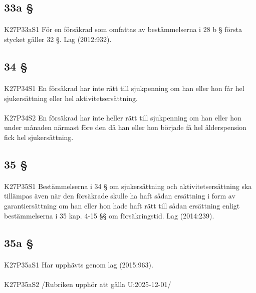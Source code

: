 \documentclass[a4paper,notitlepage,openany,10pt]{book}
\begin{document}
\subsection*{33a §}
\paragraph*{}
{\tiny K27P33aS1}
För en försäkrad som omfattas av bestämmelserna i 28 b § första stycket gäller 32 §.
Lag (2012:932).
\subsection*{34 §}
\paragraph*{}
{\tiny K27P34S1}
En försäkrad har inte rätt till sjukpenning om han eller hon får hel sjukersättning eller hel aktivitetsersättning.
\paragraph*{}
{\tiny K27P34S2}
En försäkrad har inte heller rätt till sjukpenning om han eller hon under månaden närmast före den då han eller hon började få hel ålderspension fick hel sjukersättning.
\subsection*{35 §}
\paragraph*{}
{\tiny K27P35S1}
Bestämmelserna i 34 § om sjukersättning och aktivitetsersättning ska tillämpas även när den försäkrade skulle ha haft sådan ersättning i form av garantiersättning om han eller hon hade haft rätt till sådan ersättning enligt bestämmelserna i 35 kap. 4-15 §§ om försäkringstid.
Lag (2014:239).
\subsection*{35a §}
\paragraph*{}
{\tiny K27P35aS1}
Har upphävts genom
lag (2015:963).
\paragraph*{}
{\tiny K27P35aS2}
/Rubriken upphör att gälla U:2025-12-01/
\end{document}
